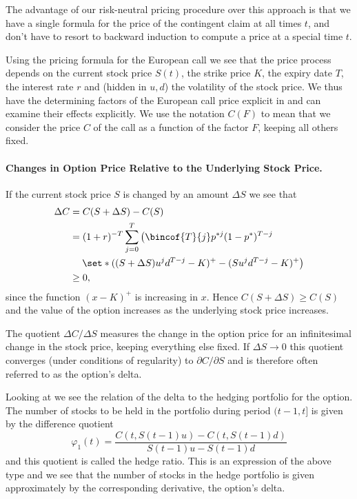 The advantage of our risk-neutral pricing procedure over this approach is that we have a single formula for the price of the contingent claim at all times $t$, and don't have to resort to backward induction to compute a price at a special time $t$.

Using the pricing formula for the European call we see that the price process depends on the current stock price $S(t)$, the strike price $K$, the expiry date $T$, the interest rate $r$ and (hidden in $u, d$) the volatility of the stock price. We thus have the determining factors of the European call price explicit in  and can examine their effects explicitly. We use the notation $C(F)$ to mean that we consider the price $C$ of the call as a function of the factor $F$, keeping all others fixed.

\paragraph{Changes in Option Price Relative to the Underlying Stock Price.}

If the current stock price $S$ is changed by an amount $\Delta S$ we see that
\begin{align*}
	\Delta C & = C(S + \Delta S) - C(S)                                                                 \\
	         & = (1+r)^{-T} \sum_{j=0}^{T} \left( \bincof{T}{j} p^{*j}(1 - p^{*})^{T-j} \right.         \\
	         & \quad \left. \set*{((S + \Delta S)u^j d^{T-j} - K)^{+} - (Su^j d^{T-j} - K)^{+}} \right) \\
	         & \geq 0,
\end{align*}
since the function $(x - K)^{+}$ is increasing in $x$. Hence $C(S + \Delta S) \geq C(S)$ and the value of the option increases as the underlying stock price increases.

The quotient $\Delta C/\Delta S$ measures the change in the option price for an infinitesimal change in the stock price, keeping everything else fixed. If $\Delta S \to 0$ this quotient converges (under conditions of regularity) to $\partial C/\partial S$ and is therefore often referred to as the option's delta.

Looking at  we see the relation of the delta to the hedging portfolio for the option. The number of stocks to be held in the portfolio during period $(t - 1, t]$ is given by the difference quotient
\[
	\varphi_1(t) = \frac{C(t, S(t - 1)u) - C(t, S(t - 1)d)}{S(t - 1)u - S(t - 1)d}
\]
and this quotient is called the hedge ratio. This is an expression of the above type and we see that the number of stocks in the hedge portfolio is given approximately by the corresponding derivative, the option's delta.

